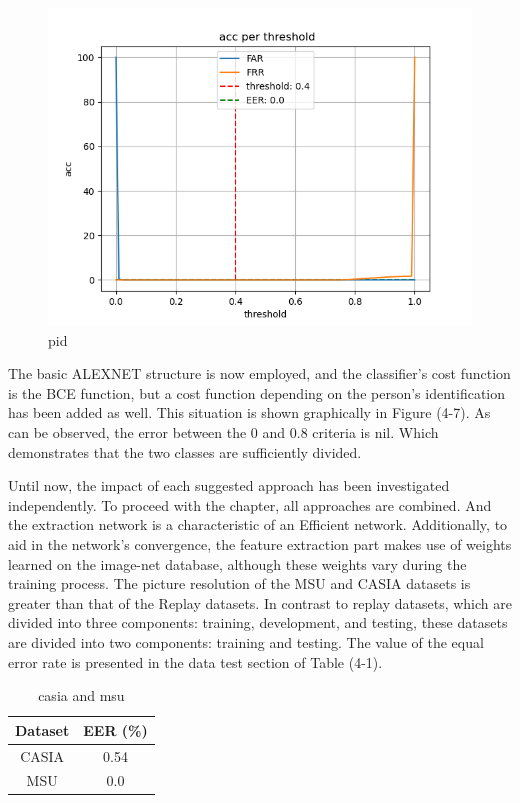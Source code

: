 \documentclass[journal]{IEEEtran}
\begin{document}
\begin{figure}[!h]
	\centerline{\includegraphics[width=\linewidth]{eer-pid}}
	\caption{pid}
	\label{fig:eer-pid}
\end{figure}

The basic ALEXNET structure is now employed, and the classifier's cost function is the BCE function, but a cost function depending on the person's identification has been added as well. This situation is shown graphically in Figure (4-7). As can be observed, the error between the 0 and 0.8 criteria is nil. Which demonstrates that the two classes are sufficiently divided.

Until now, the impact of each suggested approach has been investigated independently. To proceed with the chapter, all approaches are combined. And the extraction network is a characteristic of an Efficient network. Additionally, to aid in the network's convergence, the feature extraction part makes use of weights learned on the image-net database, although these weights vary during the training process.
The picture resolution of the MSU and CASIA datasets is greater than that of the Replay datasets. In contrast to replay datasets, which are divided into three components: training, development, and testing, these datasets are divided into two components: training and testing. The value of the equal error rate is presented in the data test section of Table (4-1).
\begin{table}[!h]
	\caption{casia and msu}
	\label{tab:eercasiamsu}
	\centering
	\begin{tabular}{|c|c|}
		\hline Dataset & EER (\%)   \\
		\hline CASIA   & 0.54     \\
		\hline MSU     & 0.0 \\
		\hline
	\end{tabular} 
\end{table}
\end{document}
